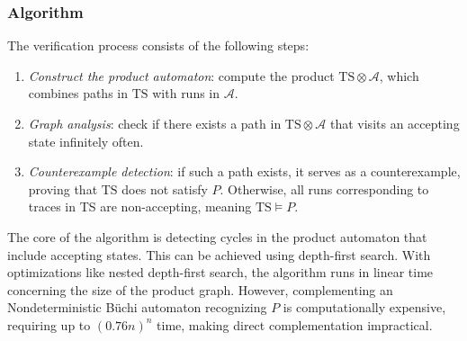 \subsubsection{Algorithm}
The verification process consists of the following steps:
\begin{enumerate}
    \item \textit{Construct the product automaton}: compute the product $\text{TS} \otimes \mathcal{A}$, which combines paths in $\text{TS}$ with runs in $\mathcal{A}$.
    \item \textit{Graph analysis}: check if there exists a path in $\text{TS} \otimes \mathcal{A}$ that visits an accepting state infinitely often.
    \item \textit{Counterexample detection}: if such a path exists, it serves as a counterexample, proving that $\text{TS}$ does not satisfy $P$.
        Otherwise, all runs corresponding to traces in TS are non-accepting, meaning $\text{TS}\models P$.
\end{enumerate}
\noindent The core of the algorithm is detecting cycles in the product automaton that include accepting states. 
This can be achieved using depth-first search.
With optimizations like nested depth-first search, the algorithm runs in linear time concerning the size of the product graph.
However, complementing an Nondeterministic Büchi automaton recognizing $P$ is computationally expensive, requiring up to $(0.76n)^n$ time, making direct complementation impractical.
